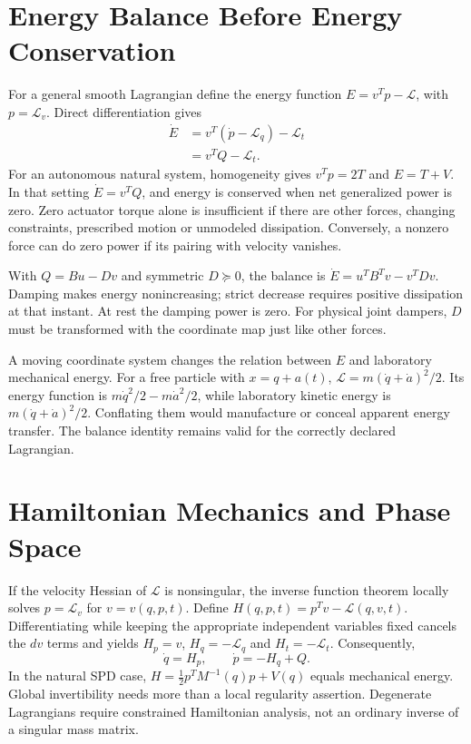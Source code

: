 \section{Energy Balance Before Energy Conservation}
\label{sec:lagrangian_energy}

For a general smooth Lagrangian define the energy function $E=v^Tp-\mathcal L$, with $p=\mathcal L_v$. Direct differentiation gives
\begin{equation}
\begin{aligned}
\dot E&=v^T(\dot p-\mathcal L_q)-\mathcal L_t\\
&=v^TQ-\mathcal L_t.
\end{aligned}
\label{eq:lagrangian_energy_balance}
\end{equation}
For an autonomous natural system, homogeneity gives $v^Tp=2T$ and $E=T+V$. In that setting $\dot E=v^TQ$, and energy is conserved when net generalized power is zero. Zero actuator torque alone is insufficient if there are other forces, changing constraints, prescribed motion or unmodeled dissipation. Conversely, a nonzero force can do zero power if its pairing with velocity vanishes.

With $Q=Bu-Dv$ and symmetric $D\succeq0$, the balance is $\dot E=u^TB^Tv-v^TDv$. Damping makes energy nonincreasing; strict decrease requires positive dissipation at that instant. At rest the damping power is zero. For physical joint dampers, $D$ must be transformed with the coordinate map just like other forces.

A moving coordinate system changes the relation between $E$ and laboratory mechanical energy. For a free particle with $x=q+a(t)$, $\mathcal L=m(\dot q+\dot a)^2/2$. Its energy function is $m\dot q^2/2-m\dot a^2/2$, while laboratory kinetic energy is $m(\dot q+\dot a)^2/2$. Conflating them would manufacture or conceal apparent energy transfer. The balance identity remains valid for the correctly declared Lagrangian.

\section{Hamiltonian Mechanics and Phase Space}
\label{sec:lagrangian_hamiltonian}

If the velocity Hessian of $\mathcal L$ is nonsingular, the inverse function theorem locally solves $p=\mathcal L_v$ for $v=v(q,p,t)$. Define $H(q,p,t)=p^Tv-\mathcal L(q,v,t)$. Differentiating while keeping the appropriate independent variables fixed cancels the $dv$ terms and yields $H_p=v$, $H_q=-\mathcal L_q$ and $H_t=-\mathcal L_t$. Consequently,
\begin{equation}
\dot q=H_p,\qquad \dot p=-H_q+Q.
\label{eq:hamiltonian_equations}
\end{equation}
In the natural SPD case, $H=\tfrac12p^TM^{-1}(q)p+V(q)$ equals mechanical energy. Global invertibility needs more than a local regularity assertion. Degenerate Lagrangians require constrained Hamiltonian analysis, not an ordinary inverse of a singular mass matrix.

